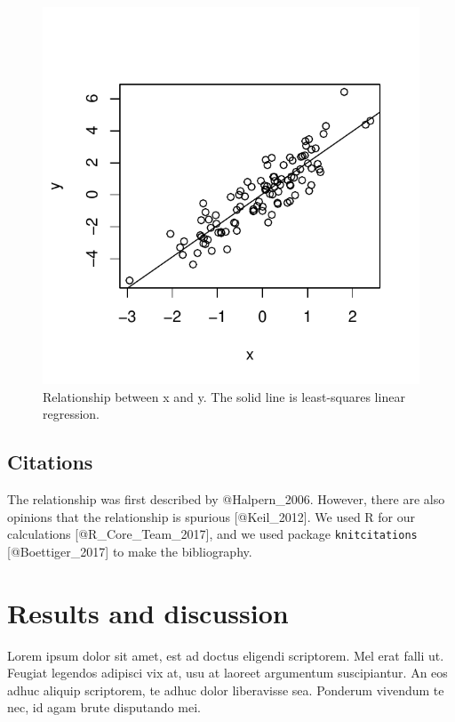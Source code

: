 \documentclass[]{article}
\begin{document}
\begin{figure}[htbp]
\centering
\includegraphics{manuscript_template_files/figure-latex/carDataPlot-1.pdf}
\caption{Relationship between x and y. The solid line is least-squares
linear regression.}
\end{figure}

\subsection{Citations}\label{citations}

The relationship was first described by @Halpern\_2006. However, there
are also opinions that the relationship is spurious {[}@Keil\_2012{]}.
We used R for our calculations {[}@R\_Core\_Team\_2017{]}, and we used
package \texttt{knitcitations} {[}@Boettiger\_2017{]} to make the
bibliography.

\section{Results and discussion}\label{results-and-discussion}

Lorem ipsum dolor sit amet, est ad doctus eligendi scriptorem. Mel erat
falli ut. Feugiat legendos adipisci vix at, usu at laoreet argumentum
suscipiantur. An eos adhuc aliquip scriptorem, te adhuc dolor
liberavisse sea. Ponderum vivendum te nec, id agam brute disputando mei.
\end{document}

